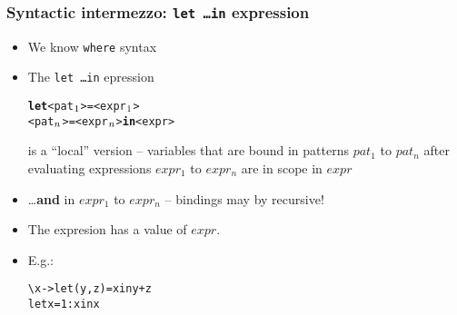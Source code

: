 \documentclass[final,handout]{beamer}
\begin{document}
\begin{frame}[fragile]
    \frametitle{Syntactic intermezzo: \texttt{let \dots in} expression}

    \begin{itemize}
        \item We know \texttt{where} syntax
        \item The \texttt{let \dots in} epression
            \begin{alltt}
    {\bf let} <pat\(\sb{1}\)> = <expr\(\sb{1}\)>
        <pat\(\sb{n}\)> = <expr\(\sb{n}\)> {\bf in} <expr>
            \end{alltt}
            is a ``local'' version -- variables that are bound in patterns $pat_1$ to
            $pat_n$ after evaluating expressions $expr_1$ to $expr_n$ are in scope in
            $expr$ 
        \item \dots \textbf{and} in $expr_1$ to $expr_n$ -- bindings may by recursive!
        \item The expresion has a value of $expr$.
        \item E.g.:
            \begin{alltt}
    \textbackslash x -> let (y, z) = x in y + z
    let x = 1 : x in x
            \end{alltt}
    \end{itemize}
\end{frame}
\end{document}
